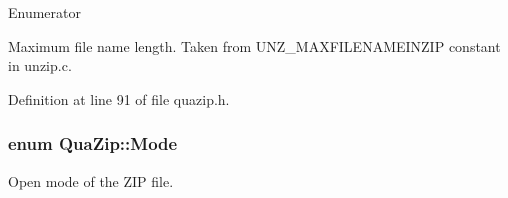 \begin{Desc}
\item[Enumerator]\par
\begin{description}
\item[{\em 
\hypertarget{class_qua_zip_adce46b942c341dbb5c851eadead65459ab26ce1a9c9e94f901dc2cf90fa5baa4b}{M\-A\-X\-\_\-\-F\-I\-L\-E\-\_\-\-N\-A\-M\-E\-\_\-\-L\-E\-N\-G\-T\-H}\label{class_qua_zip_adce46b942c341dbb5c851eadead65459ab26ce1a9c9e94f901dc2cf90fa5baa4b}
}]Maximum file name length. Taken from {\ttfamily U\-N\-Z\-\_\-\-M\-A\-X\-F\-I\-L\-E\-N\-A\-M\-E\-I\-N\-Z\-I\-P} constant in unzip.\-c. \end{description}
\end{Desc}


Definition at line 91 of file quazip.\-h.

\hypertarget{class_qua_zip_a47e28d4116ee716fdd6b431b821d0be4}{
\subsubsection[{Mode}]{\setlength{\rightskip}{0pt plus 5cm}enum {\bf Qua\-Zip\-::\-Mode}}}\label{class_qua_zip_a47e28d4116ee716fdd6b431b821d0be4}


Open mode of the Z\-I\-P file. 


